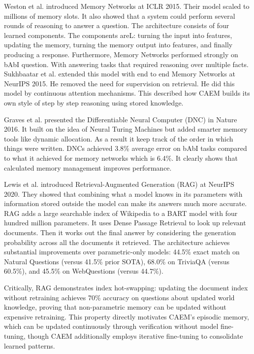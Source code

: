 Weston et al. \cite{weston2015memory} introduced Memory Networks at ICLR 2015. Their model scaled to millions of memory slots. It also showed that a system could perform several rounds of reasoning to answer a question. The architecture consists of four learned components. The components areL: turning the input into features, updating the memory, turning the memory output into features, and finally producing a response. Furthermore, Memory Networks performed strongly on bAbI question. With answering tasks that required reasoning over multiple facts. Sukhbaatar et al. \cite{NIPS2015_8fb21ee7} extended this  model with end to end Memory Networks at NeurIPS 2015. He removed the need for supervision on retrieval. He did this model by continuous attention mechanisms. This described how CAEM builds its own style of step by step reasoning using stored knowledge.

Graves et al. \cite{graves2016differentiable} presented the Differentiable Neural Computer (DNC) in Nature 2016. It built on the idea of Neural Turing Machines but added smarter memory tools like dynamic allocation. As a result it keep track of the order in which things were written. DNCs achieved 3.8\% average error on bAbI tasks compared to what it achieved for memory networks which is 6.4\%. It clearly shows that calculated memory management improves performance.

Lewis et al. \cite{NEURIPS2020_6b493230} introduced Retrieval-Augmented Generation (RAG) at NeurIPS 2020. They showed that combining what a model knows in its parameters with information stored outside the model can make its answers much more accurate. RAG adds a large searchable index of Wikipedia to a BART model with four hundred million parameters. It uses Dense Passage Retrieval to look up relevant documents. Then it works out the final answer by considering the generation probability across all the documents it retrieved. The architecture achieves substantial improvements over parametric-only models: 44.5\% exact match on Natural Questions (versus 41.5\% prior SOTA), 68.0\% on TriviaQA (versus 60.5\%), and 45.5\% on WebQuestions (versus 44.7\%).

Critically, RAG demonstrates index hot-swapping: updating the document index without retraining achieves 70\% accuracy on questions about updated world knowledge, proving that non-parametric memory can be updated without expensive retraining. This property directly motivates CAEM's episodic memory, which can be updated continuously through verification without model fine-tuning, though CAEM additionally employs iterative fine-tuning to consolidate learned patterns.

